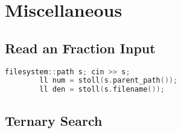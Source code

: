 \chapter{Miscellaneous}

\section{Read an Fraction Input}

    \begin{lstlisting}[language=c++]
        filesystem::path s; cin >> s;
        ll num = stoll(s.parent_path());
        ll den = stoll(s.filename());
    \end{lstlisting}
    

\section{Ternary Search}

